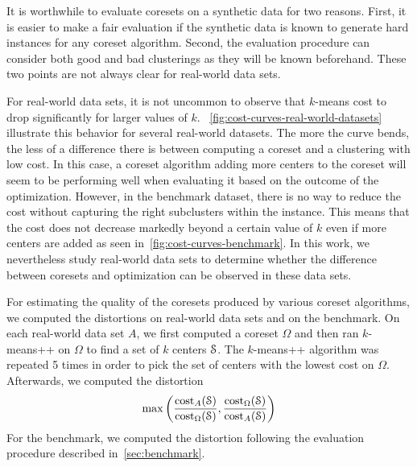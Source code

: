 It is worthwhile to evaluate coresets on a synthetic data for two reasons. First, it is easier to make a fair evaluation if the synthetic data is known to generate hard instances for any coreset algorithm. Second, the evaluation procedure can consider both good and bad clusterings as they will be known beforehand. These two points are not always clear for real-world data sets.

For real-world data sets, it is not uncommon to observe that $k$-means cost to drop significantly for larger values of $k$. ~\cref{fig:cost-curves-real-world-datasets} illustrate this behavior for several real-world datasets. The more the curve bends, the less of a difference there is between computing a coreset and a clustering with low cost. In this case, a coreset algorithm adding more centers to the coreset will seem to be performing well when evaluating it based on the outcome of the optimization. However, in the benchmark dataset, there is no way to reduce the cost without capturing the right subclusters within the instance. This means that the cost does not decrease markedly beyond a certain value of $k$ even if more centers are added as seen in~\cref{fig:cost-curves-benchmark}. In this work, we nevertheless study real-world data sets to determine whether the difference between coresets and optimization can be observed in these data sets.




For estimating the quality of the coresets produced by various coreset algorithms, we computed the distortions on real-world data sets and on the benchmark. On each real-world data set $A$, we first computed a coreset $\Omega$ and then ran $k$-means++ on $\Omega$ to find a set of $k$ centers $\mathcal{S}$. The $k$-means++ algorithm was repeated 5 times in order to pick the set of centers with the lowest cost on $\Omega$.
Afterwards, we computed the distortion
\begin{align*}
    \max\left(
      \frac{\text{cost}_A(\mathcal{S})}{\text{cost}_{\Omega}(\mathcal{S})},
      \frac{\text{cost}_{\Omega}(\mathcal{S})}{\text{cost}_A(\mathcal{S})}
    \right)
\end{align*}
For the benchmark, we computed the distortion following the evaluation procedure described in~\cref{sec:benchmark}.


